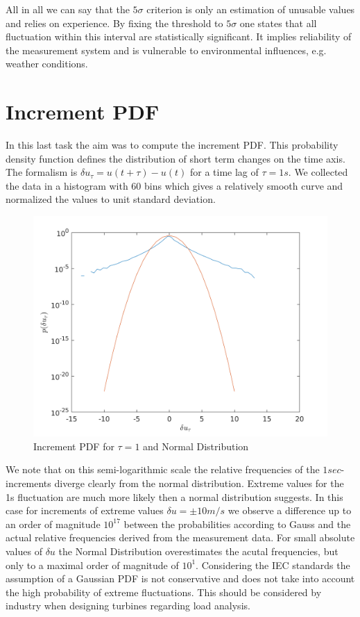 \documentclass[10pt]{article}
\begin{document}
All in all we can say that the $5\sigma$ criterion is only an estimation of unusable values and relies on experience. By fixing the threshold to $5\sigma$ one states that all fluctuation within this interval are statistically significant. It implies reliability of the measurement system and is vulnerable to environmental influences, e.g. weather conditions.

\section{Increment PDF}
In this last task the aim was to compute the increment PDF. This probability density function defines the distribution of short term changes on the time axis. The formalism is $\delta u_{\tau} = u(t+\tau)-u(t)$ for a time lag of $\tau=1s$. We collected the data in a histogram with $60$ bins which gives a relatively smooth curve and normalized the values to unit standard deviation.
\begin{figure}[htb!]
  \centering
  \includegraphics[width=1\linewidth]{../Plots/tau_pdf_gauss10.png}
  \caption{Increment PDF for $\tau=1$ and Normal Distribution}
  \label{fig:incrementPdf}
\end{figure}
We note that on this semi-logarithmic scale the relative frequencies of the $1sec$-increments diverge clearly from the normal distribution. Extreme values for the 1s fluctuation are much more likely then a normal distribution suggests. In this case for increments of extreme values $\delta u=\pm10 m/s$ we observe a difference up to an order of magnitude $10^{17}$ between the probabilities according to Gauss and the actual relative frequencies derived from the measurement data. For small absolute values of $\delta u$ the Normal Distribution overestimates the acutal frequencies, but only to a maximal order of magnitude of $10^1$. Considering the IEC standards the assumption of a Gaussian PDF is not conservative and does not take into account the high probability of extreme fluctuations. This should be considered by industry when designing turbines regarding load analysis.
\end{document}

